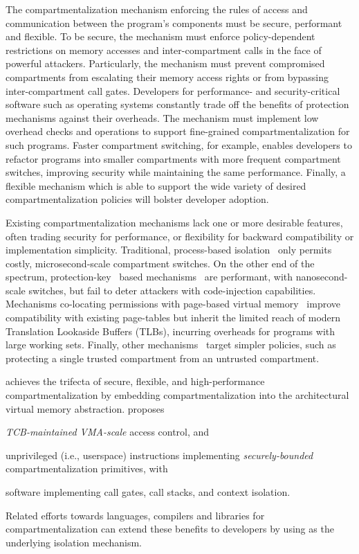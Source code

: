 The compartmentalization mechanism enforcing
the rules of access and communication between the program's 
components must be secure, performant and flexible.
To be secure, the mechanism must enforce policy-dependent 
restrictions on memory accesses and inter-compartment calls
in the face of powerful attackers.
Particularly, the mechanism must prevent compromised compartments
from escalating their memory access rights or from bypassing
inter-compartment call gates.
%
Developers for performance- and security-critical software such as
operating systems constantly trade off the benefits of protection mechanisms
against their overheads.
The mechanism must implement low overhead checks and operations to support 
fine-grained compartmentalization for such programs.
Faster compartment switching, for example, 
enables developers to refactor programs into smaller compartments
with more frequent compartment switches,
improving security while maintaining the same performance.
%
Finally, a flexible mechanism which is able to support the wide variety of 
desired compartmentalization policies will bolster developer adoption.

Existing compartmentalization mechanisms lack one or more 
desirable features, often trading security for performance,
or flexibility for backward compatibility or implementation simplicity.
Traditional, process-based 
isolation~\cite{KleinEHACDEEKNSTW09,LittonVE0BD16,WitchelCA02MMP}
only permits costly, microsecond-scale compartment switches.
On the other end of the spectrum, protection-key~\cite{guide2011intel} based 
mechanisms~\cite{ParkLXMK19,ERIMOberwagner19,SchrammelWSS0MG20Donky}
are performant, with nanosecond-scale switches,
but fail to deter attackers with code-injection capabilities.
Mechanisms co-locating permissions with page-based virtual 
memory~\cite{ERIMOberwagner19,SchrammelWSS0MG20Donky,LeeSK18,DuHXZC19XPC,
KoningCBGA17,HedayatiGJCSSM19Hodor}
improve compatibility with existing page-tables but
inherit the limited reach of modern 
Translation Lookaside Buffers (TLBs), incurring overheads
for programs with large working sets.
Finally, other mechanisms~\cite{KoningCBGA17,FrassettoJLS18} 
target simpler policies, 
such as protecting a single trusted compartment from an untrusted 
compartment.

\seccells achieves the trifecta of secure, flexible, and high-performance 
compartmentalization by embedding compartmentalization into the 
architectural virtual memory abstraction.
\seccells proposes 
\begin{inparaenum}
\item \emph{TCB-maintained VMA-scale} access control, and 
\item unprivileged (i.e., userspace) instructions implementing 
\emph{securely-bounded} compartmentalization primitives, with
\item software implementing call gates, call stacks, and context isolation.
\end{inparaenum}
Related efforts towards languages, compilers and libraries for
compartmentalization can extend these benefits to developers
by using \seccells as the underlying isolation mechanism.

